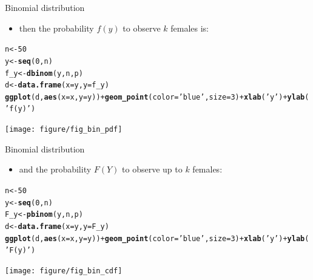 \documentclass{beamer}\usepackage[]{graphicx}\usepackage[]{color}
\makeatletter
\newcommand{\hlnum}[1]{\textcolor[rgb]{0.686,0.059,0.569}{#1}}%
\newcommand{\hlstr}[1]{\textcolor[rgb]{0.192,0.494,0.8}{#1}}%
\newcommand{\hlopt}[1]{\textcolor[rgb]{0,0,0}{#1}}%
\newcommand{\hlstd}[1]{\textcolor[rgb]{0.345,0.345,0.345}{#1}}%
\newcommand{\hlkwb}[1]{\textcolor[rgb]{0.69,0.353,0.396}{#1}}%
\newcommand{\hlkwc}[1]{\textcolor[rgb]{0.333,0.667,0.333}{#1}}%
\newcommand{\hlkwd}[1]{\textcolor[rgb]{0.737,0.353,0.396}{\textbf{#1}}}%
\newenvironment{kframe}{%
 \def\at@end@of@kframe{}%
 \ifinner\ifhmode%
  \def\at@end@of@kframe{\end{minipage}}%
  \begin{minipage}{\columnwidth}%
 \fi\fi%
 \def\FrameCommand##1{\hskip\@totalleftmargin \hskip-\fboxsep
 \colorbox{shadecolor}{##1}\hskip-\fboxsep
     \hskip-\linewidth \hskip-\@totalleftmargin \hskip\columnwidth}%
 \MakeFramed {\advance\hsize-\width
   \@totalleftmargin\z@ \linewidth\hsize
   \@setminipage}}%
 {\par\unskip\endMakeFramed%
 \at@end@of@kframe}
\newenvironment{knitrout}{}{} %
\makeatother
\begin{document}
\begin{frame}[fragile]{Binomial distribution}
  \begin{itemize}
    \item then the probability $f(y)$ to observe $k$ females is:
  \end{itemize}
\begin{knitrout}\tiny
{}\color{fgcolor}\begin{kframe}
\begin{alltt}
\hlstd{n} \hlkwb{<-} \hlnum{50}
\hlstd{y} \hlkwb{<-} \hlkwd{seq}\hlstd{(}\hlnum{0}\hlstd{, n)}
\hlstd{f_y} \hlkwb{<-} \hlkwd{dbinom}\hlstd{(y, n, p)}
\hlstd{d} \hlkwb{<-} \hlkwd{data.frame}\hlstd{(}\hlkwc{x}\hlstd{=y,} \hlkwc{y}\hlstd{=f_y)}
\hlkwd{ggplot}\hlstd{(d,} \hlkwd{aes}\hlstd{(}\hlkwc{x}\hlstd{=x,} \hlkwc{y}\hlstd{=y))} \hlopt{+} \hlkwd{geom_point}\hlstd{(}\hlkwc{color}\hlstd{=}\hlstr{'blue'}\hlstd{,} \hlkwc{size}\hlstd{=}\hlnum{3}\hlstd{)} \hlopt{+} \hlkwd{xlab}\hlstd{(}\hlstr{'y'}\hlstd{)} \hlopt{+} \hlkwd{ylab}\hlstd{(}\hlstr{'f(y)'}\hlstd{)}
\end{alltt}
\end{kframe}

{\centering \texttt{[image: figure/fig\_bin\_pdf]} 

}



\end{knitrout}
\end{frame}

\begin{frame}[fragile]{Binomial distribution}
  \begin{itemize}
    \item and the probability $F(Y)$ to observe up to $k$ females:
  \end{itemize}
\begin{knitrout}\tiny
{}\color{fgcolor}\begin{kframe}
\begin{alltt}
\hlstd{n} \hlkwb{<-} \hlnum{50}
\hlstd{y} \hlkwb{<-} \hlkwd{seq}\hlstd{(}\hlnum{0}\hlstd{, n)}
\hlstd{F_y} \hlkwb{<-} \hlkwd{pbinom}\hlstd{(y, n, p)}
\hlstd{d} \hlkwb{<-} \hlkwd{data.frame}\hlstd{(}\hlkwc{x}\hlstd{=y,} \hlkwc{y}\hlstd{=F_y)}
\hlkwd{ggplot}\hlstd{(d,} \hlkwd{aes}\hlstd{(}\hlkwc{x}\hlstd{=x,} \hlkwc{y}\hlstd{=y))} \hlopt{+} \hlkwd{geom_point}\hlstd{(}\hlkwc{color}\hlstd{=}\hlstr{'blue'}\hlstd{,} \hlkwc{size}\hlstd{=}\hlnum{3}\hlstd{)} \hlopt{+} \hlkwd{xlab}\hlstd{(}\hlstr{'y'}\hlstd{)} \hlopt{+} \hlkwd{ylab}\hlstd{(}\hlstr{'F(y)'}\hlstd{)}
\end{alltt}
\end{kframe}

{\centering \texttt{[image: figure/fig\_bin\_cdf]} 

}



\end{knitrout}
\end{frame}
\end{document}
